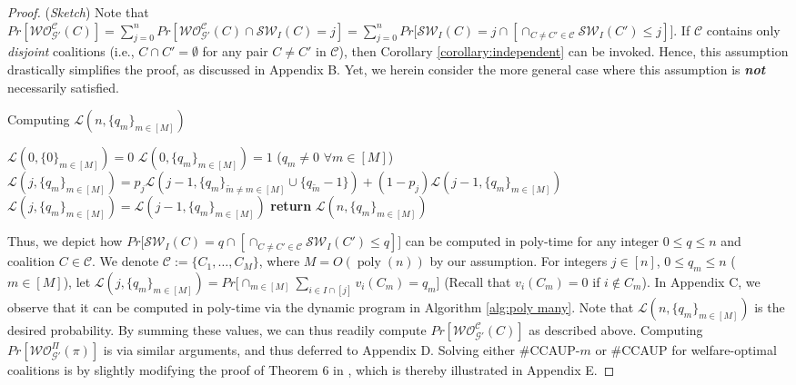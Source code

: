 \documentclass[letterpaper]{article}
\DeclareMathOperator*{\poly}{poly}
\begin{document}
\begin{proof}
(\textit{Sketch}) Note that $Pr[\mathcal{WO}^{\mathcal{C}}_{\mathcal{G}'}(C)] = \sum_{j=0}^{n} Pr[\mathcal{WO}^{\mathcal{C}}_{\mathcal{G}'}(C) \cap \mathcal{SW}_I(C) = j] = \sum_{j=0}^n Pr\big[\mathcal{SW}_I(C) = j \cap [\cap_{C \neq C' \in \mathcal{C}} \mathcal{SW}_I(C') \leq j]\big]$. If $\mathcal{C}$ contains only \textit{disjoint} coalitions (i.e., $C \cap C' = \emptyset$ for any pair $C \neq C'$ in $\mathcal{C}$), then Corollary \ref{corollary:independent} can be invoked. Hence, this assumption drastically simplifies the proof, as discussed in Appendix B. Yet, we herein consider the more general case where this assumption is \textit{\textbf{not}} necessarily satisfied.

\begin{algorithm}[tb]
\caption{Computing $\mathcal{L}(n,\{q_m\}_{m \in [M]})$}
\label{alg:poly many}
\begin{algorithmic}[1] %
\STATE $\mathcal{L}(0,\{0\}_{m \in [M]}) = 0$
\STATE $\mathcal{L}(0,\{q_m\}_{m \in [M]}) = 1$ ($q_m \neq 0$ $\forall m \in [M]$)
\STATE $\mathcal{L}(j,\{q_m\}_{m \in [M]}) = p_j \mathcal{L}(j-1,\{q_m\}_{\tilde{m} \neq m \in [M]} \cup \{q_{\tilde{m}} - 1\}) + (1-p_j) \mathcal{L}(j-1,\{q_m\}_{m \in [M]})$
\ELSE
\STATE $\mathcal{L}(j,\{q_m\}_{m \in [M]}) = \mathcal{L}(j-1,\{q_m\}_{m \in [M]})$
\ENDIF
\ENDFOR
\STATE \textbf{return} $\mathcal{L}(n,\{q_m\}_{m \in [M]})$
\end{algorithmic}
\end{algorithm}


Thus, we depict how $Pr\big[\mathcal{SW}_I(C) = q \cap [\cap_{C \neq C' \in \mathcal{C}} \mathcal{SW}_I(C') \leq q]\big]$ can be computed in poly-time for any integer $0 \leq q \leq n$ and coalition $C \in \mathcal{C}$. We denote $\mathcal{C} := \{C_1, \dots, C_M\}$, where $M = O(\poly(n))$ by our assumption. For integers $j \in [n]$, $0 \leq q_m \leq n$ ($m \in [M]$), let $\mathcal{L}(j,\{q_m\}_{m \in [M]}) = Pr\big[\cap_{m \in [M]} \sum_{i \in I \cap [j]} v_i(C_m) = q_m \big]$ (Recall that $v_i(C_m) = 0$ if $i \notin C_m$). In Appendix C, we observe that it can be computed in poly-time via the dynamic program in Algorithm \ref{alg:poly many}. Note that $\mathcal{L}(n,\{q_m\}_{m \in [M]})$ is the desired probability. By summing these values, we can thus readily compute $Pr[\mathcal{WO}^{\mathcal{C}}_{\mathcal{G}'}(C)]$ as described above. Computing $Pr[\mathcal{WO}_{\mathcal{G}'}^{\Pi}(\pi)]$ is via similar arguments, and thus deferred to Appendix D. Solving either \#CCAUP-$m$ or \#CCAUP for welfare-optimal coalitions is by slightly modifying the proof of Theorem 6 in \cite{wojtas2012possible}, which is thereby illustrated in Appendix E.
\end{proof}
\end{document}
